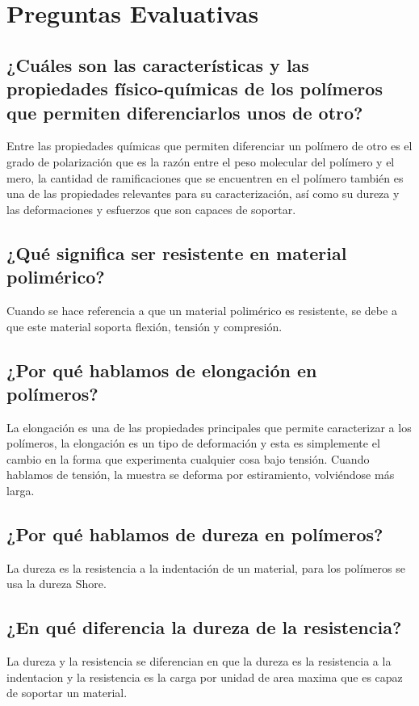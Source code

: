 \documentclass[a4paper, 11pt]{article}
\begin{document}
\section{Preguntas Evaluativas}
\subsection{¿Cuáles son las características y las propiedades físico-químicas de los polímeros que permiten diferenciarlos unos de otro?}
Entre las propiedades químicas que permiten diferenciar un polímero de otro es el grado de polarización que es la razón entre el peso molecular del polímero y el mero, la cantidad de ramificaciones que se encuentren en el polímero también es una de las propiedades relevantes para su caracterización, así como su dureza y las deformaciones y esfuerzos que son capaces de soportar.

\subsection{¿Qué significa ser resistente en material polimérico?}
Cuando se hace referencia a que un material polimérico es resistente, se debe a que este material soporta flexión, tensión y compresión. 

\subsection{¿Por qué hablamos de elongación en polímeros?}
La elongación es una de las propiedades principales que permite caracterizar a los polímeros, la elongación es un tipo de deformación y esta es simplemente el cambio en la forma que experimenta cualquier cosa bajo tensión. Cuando hablamos de tensión, la muestra se deforma por estiramiento, volviéndose más larga.

\subsection{¿Por qué hablamos de dureza en polímeros?}
La dureza es la resistencia a la indentación de un material, para los polímeros se usa la dureza Shore.

\subsection{¿En qué diferencia la dureza de la resistencia?}
La dureza y la resistencia se diferencian en que la dureza es la resistencia a la indentacion y la resistencia es la carga por unidad de area maxima que es capaz de soportar un material. 
\end{document}

